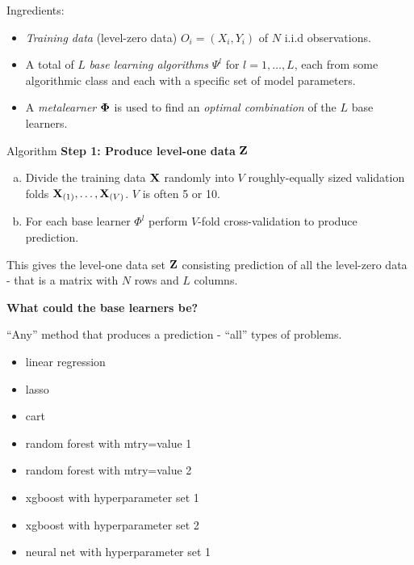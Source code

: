 \documentclass[
  ignorenonframetext,
]{beamer}
\providecommand{\tightlist}{%
  \setlength{\itemsep}{0pt}\setlength{\parskip}{0pt}}
\begin{document}
\begin{frame}
\begin{block}{Ingredients:}
\protect\hypertarget{ingredients}{}
\begin{itemize}
\tightlist
\item
  \emph{Training data} (level-zero data) \(O_i=(X_i,Y_i)\) of \(N\)
  i.i.d observations.
\item
  A total of \(L\) \emph{base learning algorithms} \(\Psi^l\) for
  \(l=1,\ldots,L\), each from some algorithmic class and each with a
  specific set of model parameters.
\item
  A \emph{metalearner} \({\bf \Phi}\) is used to find an \emph{optimal
  combination} of the \(L\) base learners.
\end{itemize}
\end{block}
\end{frame}

\begin{frame}
\begin{block}{Algorithm}
\protect\hypertarget{algorithm}{}
\textbf{Step 1: Produce level-one data} \({\bf Z}\)

\begin{enumerate}
[a)]
\item
  Divide the training data \({\bf X}\) randomly into \(V\)
  roughly-equally sized validation folds
  \({\bf X}_{(1)},\ldots,{\bf X}_{(V)}\). \(V\) is often 5 or 10.
\item
  For each base learner \(\Phi^l\) perform \(V\)-fold cross-validation
  to produce prediction.
\end{enumerate}

This gives the level-one data set \({\bf Z}\) consisting prediction of
all the level-zero data - that is a matrix with \(N\) rows and \(L\)
columns.

\textbf{What could the base learners be?}
\end{block}
\end{frame}

\begin{frame}
``Any'' method that produces a prediction - ``all'' types of problems.

\begin{itemize}
\tightlist
\item
  linear regression
\item
  lasso
\item
  cart
\item
  random forest with mtry=value 1
\item
  random forest with mtry=value 2
\item
  xgboost with hyperparameter set 1
\item
  xgboost with hyperparameter set 2
\item
  neural net with hyperparameter set 1
\end{itemize}
\end{frame}
\end{document}
